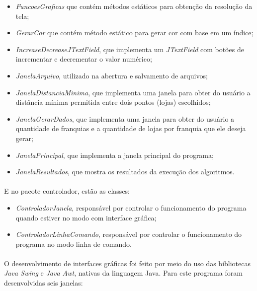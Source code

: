\documentclass[12pt]{article}
\begin{document}
\begin{itemize}
    \item \textit{FuncoesGraficas} que contém métodos estáticos para obtenção da resolução da tela;
    \item \textit{GerarCor} que contém método estático para gerar cor com base em um índice;
    \item \textit{IncreaseDecreaseJTextField}, que implementa um \textit{JTextField} com botões de incrementar e decrementar o valor numérico;
    \item \textit{JanelaArquivo}, utilizado na abertura e salvamento de arquivos;
    \item \textit{JanelaDistanciaMinima}, que implementa uma janela para obter do usuário a distância mínima permitida entre dois pontos (lojas) escolhidos;
    \item \textit{JanelaGerarDados}, que implementa uma janela para obter do usuário a quantidade de franquias e a quantidade de lojas por franquia que ele deseja gerar;
    \item \textit{JanelaPrincipal}, que implementa a janela principal do programa;
    \item \textit{JanelaResultados}, que mostra os resultados da execução dos algoritmos. 
\end{itemize}

\paragraph{}E no pacote controlador, estão as classes:

\begin{itemize}
    \item \textit{ControladorJanela}, responsável por controlar o funcionamento do programa quando estiver no modo com interface gráfica;
    \item \textit{ControladorLinhaComando}, responsável por controlar o funcionamento do programa no modo linha de comando.
\end{itemize}

\paragraph{}O desenvolvimento de interfaces gráficas foi feito por meio do uso das \mbox{bibliotecas} \textit{Java Swing} e \textit{Java Awt}, nativas da linguagem Java. Para este programa foram desenvolvidas seis janelas:
\end{document}
